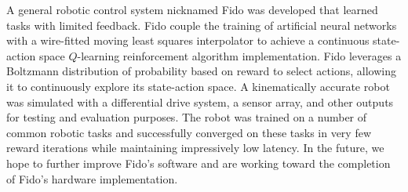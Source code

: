 A general robotic control system nicknamed Fido was developed that learned tasks with limited feedback. Fido couple the training of artificial neural networks with a wire-fitted moving least squares interpolator to achieve a continuous state-action space $Q$-learning reinforcement algorithm implementation. Fido leverages a Boltzmann distribution of probability based on reward to select actions, allowing it to continuously explore its state-action space. A kinematically accurate robot was simulated with a differential drive system, a sensor array, and other outputs for testing and evaluation purposes. The robot was trained on a number of common robotic tasks and successfully converged on these tasks in very few reward iterations while maintaining impressively low latency. In the future, we hope to further improve Fido's software and are working toward the completion of Fido's hardware implementation.